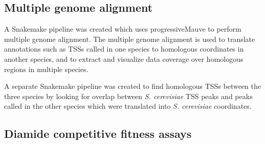 \subsection{Multiple genome alignment}

A Snakemake pipeline was created which uses progressiveMauve \citep{darling2010} to perform multiple genome alignment.
The multiple genome alignment is used to translate annotations such as TSSs called in one species to homologous coordinates in another species, and to extract and visualize data coverage over homologous regions in multiple species.

A separate Snakemake pipeline was created to find homologous TSSs between the three species by looking for overlap between \textit{S. cerevisiae} TSS peaks and peaks called in the other species which were translated into \textit{S. cerevisiae} coordinates.

\subsection{Diamide competitive fitness assays}

\newpage

\begingroup
\singlespacing

\endgroup
